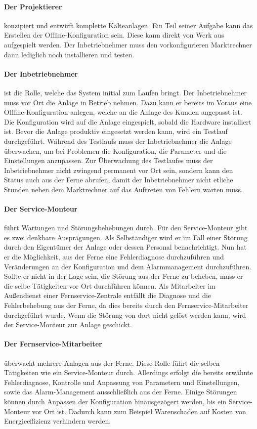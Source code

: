 \documentclass[11pt,a4paper]{report}
\begin{document}
\paragraph{Der Projektierer} konzipiert und entwirft komplette Kälteanlagen. Ein Teil seiner Aufgabe kann das Erstellen der Offline-Konfiguration sein. Diese kann direkt von Werk aus aufgespielt werden. Der Inbetriebnehmer muss den vorkonfigurieren Marktrechner dann lediglich noch installieren und testen.

\paragraph{Der Inbetriebnehmer} ist die Rolle, welche das System initial zum Laufen bringt. Der Inbetriebnehmer muss vor Ort die Anlage in Betrieb nehmen. Dazu kann er bereits im Voraus eine Offline-Konfiguration anlegen, welche an die Anlage des Kunden angepasst ist. Die Konfiguration wird auf die Anlage eingespielt, sobald die Hardware installiert ist. Bevor die Anlage produktiv eingesetzt werden kann, wird ein Testlauf durchgeführt. Während des Testlaufs muss der Inbetriebnehmer die Anlage überwachen, um bei Problemen die Konfiguration, die Parameter und die Einstellungen anzupassen. Zur Überwachung des Testlaufes muss der Inbetriebnehmer nicht zwingend permanent vor Ort sein, sondern kann den Status auch aus der Ferne abrufen, damit der Inbetriebnehmer nicht etliche Stunden neben dem Marktrechner auf das Auftreten von Fehlern warten muss.

\paragraph{Der Service-Monteur} führt Wartungen und Störungsbehebungen durch. Für den Service-Monteur gibt es zwei denkbare Ausprägungen. Als Selbständiger wird er im Fall einer Störung durch den Eigentümer der Anlage oder dessen Personal benachrichtigt. Nun hat er die Möglichkeit, aus der Ferne eine Fehlerdiagnose durchzuführen und Veränderungen an der Konfiguration und dem Alarmmanagement durchzuführen. Sollte er nicht in der Lage sein, die Störung aus der Ferne zu beheben, muss er die selbe Tätigkeiten vor Ort durchführen können. Als Mitarbeiter im Außendienst einer Fernservice-Zentrale entfällt die Diagnose und die Fehlerbehebung aus der Ferne, da dies bereits durch den Fernservice-Mitarbeiter durchgeführt wurde. Wenn die Störung von dort nicht gelöst werden kann, wird der Service-Monteur zur Anlage geschickt.

\paragraph{Der Fernservice-Mitarbeiter} überwacht mehrere Anlagen aus der Ferne. Diese Rolle führt die selben Tätigkeiten wie ein Service-Monteur durch. Allerdings erfolgt die bereits erwähnte Fehlerdiagnose, Kontrolle und Anpassung von Parametern und Einstellungen, sowie das Alarm-Management ausschließlich aus der Ferne. Einige Störungen können durch Anpassen der Konfiguration hinausgezögert werden, bis ein Service-Monteur vor Ort ist. Dadurch kann zum Beispiel Warenschaden auf Kosten von Energieeffizienz verhindern werden.
\end{document}
